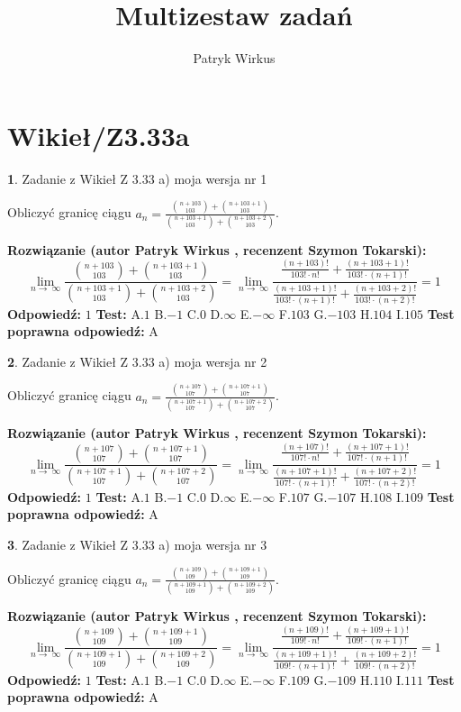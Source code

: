 \documentclass[12pt, a4paper]{article}
\title{Multizestaw zadań}
\author{Patryk Wirkus}
\date{}
\theoremstyle{definition} %
\newtheorem{zad}{}
\newcommand{\kategoria}[1]{\section{#1}}
\newcommand{\zadStart}[1]{\begin{zad}#1\newline}
\newcommand{\zadStop}{\end{zad}}
\newcommand{\rozwStart}[2]{\noindent \textbf{Rozwiązanie (autor #1 , recenzent #2): }\newline}
\newcommand{\rozwStop}{\newline}
\newcommand{\odpStart}{\noindent \textbf{Odpowiedź:}\newline}
\newcommand{\odpStop}{\newline}
\newcommand{\testStart}{\noindent \textbf{Test:}\newline}
\newcommand{\testStop}{\newline}
\newcommand{\kluczStart}{\noindent \textbf{Test poprawna odpowiedź:}\newline}
\newcommand{\kluczStop}{\newline}
\begin{document}
\maketitle

\kategoria{Wikieł/Z3.33a}


\zadStart{Zadanie z Wikieł Z 3.33 a) moja wersja nr 1}

Obliczyć granicę ciągu $a_{n}=\frac{{n+103\choose103}+{n+103+1\choose103}}{{n+103+1\choose103}+{n+103+2\choose103}}$.
\zadStop
\rozwStart{Patryk Wirkus}{Szymon Tokarski}
$$\lim\limits_{n\to\ \infty}\frac{{n+103\choose103}+{n+103+1\choose103}}{{n+103+1\choose103}+{n+103+2\choose103}} = \lim\limits_{n\to\ \infty}\frac{\frac{(n+103)!}{103! \cdot n!}+\frac{(n+103+1)!}{103! \cdot (n+1)!}}{\frac{(n+103+1)!}{103! \cdot (n+1)!}+\frac{(n+103+2)!}{103! \cdot (n+2)!}} = 1$$
\rozwStop
\odpStart
$1$
\odpStop
\testStart
A.$1$ B.$-1$ C.$0$ D.$\infty$ E.$-\infty$
F.$103$ G.$-103$
H.$104$
I.$105$
\testStop
\kluczStart
A
\kluczStop



\zadStart{Zadanie z Wikieł Z 3.33 a) moja wersja nr 2}

Obliczyć granicę ciągu $a_{n}=\frac{{n+107\choose107}+{n+107+1\choose107}}{{n+107+1\choose107}+{n+107+2\choose107}}$.
\zadStop
\rozwStart{Patryk Wirkus}{Szymon Tokarski}
$$\lim\limits_{n\to\ \infty}\frac{{n+107\choose107}+{n+107+1\choose107}}{{n+107+1\choose107}+{n+107+2\choose107}} = \lim\limits_{n\to\ \infty}\frac{\frac{(n+107)!}{107! \cdot n!}+\frac{(n+107+1)!}{107! \cdot (n+1)!}}{\frac{(n+107+1)!}{107! \cdot (n+1)!}+\frac{(n+107+2)!}{107! \cdot (n+2)!}} = 1$$
\rozwStop
\odpStart
$1$
\odpStop
\testStart
A.$1$ B.$-1$ C.$0$ D.$\infty$ E.$-\infty$
F.$107$ G.$-107$
H.$108$
I.$109$
\testStop
\kluczStart
A
\kluczStop



\zadStart{Zadanie z Wikieł Z 3.33 a) moja wersja nr 3}

Obliczyć granicę ciągu $a_{n}=\frac{{n+109\choose109}+{n+109+1\choose109}}{{n+109+1\choose109}+{n+109+2\choose109}}$.
\zadStop
\rozwStart{Patryk Wirkus}{Szymon Tokarski}
$$\lim\limits_{n\to\ \infty}\frac{{n+109\choose109}+{n+109+1\choose109}}{{n+109+1\choose109}+{n+109+2\choose109}} = \lim\limits_{n\to\ \infty}\frac{\frac{(n+109)!}{109! \cdot n!}+\frac{(n+109+1)!}{109! \cdot (n+1)!}}{\frac{(n+109+1)!}{109! \cdot (n+1)!}+\frac{(n+109+2)!}{109! \cdot (n+2)!}} = 1$$
\rozwStop
\odpStart
$1$
\odpStop
\testStart
A.$1$ B.$-1$ C.$0$ D.$\infty$ E.$-\infty$
F.$109$ G.$-109$
H.$110$
I.$111$
\testStop
\kluczStart
A
\kluczStop
\end{document}
